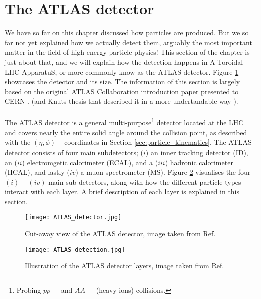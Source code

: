 \documentclass[14pt, a4paper]{book}
\begin{document}
\section{The ATLAS detector}\label{sec:ATLAS}
We have so far on this chapter discussed how particles are produced. But we so far not yet explained how we actually detect them, arguably the most important matter in the field of high energy particle physics!
This section of the chapter is just about that, and we will explain how the detection happens in A Toroidal LHC ApparatuS, or more commonly know as the ATLAS detector. Figure \ref{fig:ATLAS_detector} showcases 
the detector and its size. The information of this section is largely based on the original ATLAS Collaboration introduction paper presented to CERN 
\cite{Aad:1129811}. (and Knuts thesis \cite{KNUT_VADLA} that described it in a more undertandable way ). \\
\\The ATLAS detector is a general multi-purpose\footnote{Probing $pp-$ and $AA-$ (heavy ions) collisions.} detector located at the LHC and covers nearly the entire solid angle 
around the collision point, as described with the $(\eta,\phi)-$coordinates in Section \ref{sec:particle_kinematics}. The ATLAS detector consists of four main subdetectors; ($i$) an inner tracking detector (ID), 
an ($ii$) electromgetic calorimeter (ECAL), and a ($iii$) hadronic calorimeter (HCAL), and lastly ($iv$) a muon spectrometer (MS). Figure \ref{fig:ATLAS_layers} visualises the four $(i)-(iv)$ main sub-detectors, 
along with how the different particle types interact with each layer. A brief description of each layer is explained in this section.
\begin{figure}[!ht]
	\centering
    \texttt{[image: ATLAS\_detector.jpg]}
    \caption[The ATLAS detector]{Cut-away view of the ATLAS detector, image taken from Ref. \cite{Aad:1129811}}\label{fig:ATLAS_detector}
\end{figure}
\begin{figure}[!ht]
	\centering
    \texttt{[image: ATLAS\_detection.jpg]}
    \caption[Illustration of the ATLAS detector layers]{Illustration of the ATLAS detector layers, image taken from Ref. \cite{Pequenao:1505342}}\label{fig:ATLAS_layers}
\end{figure}
\end{document}
